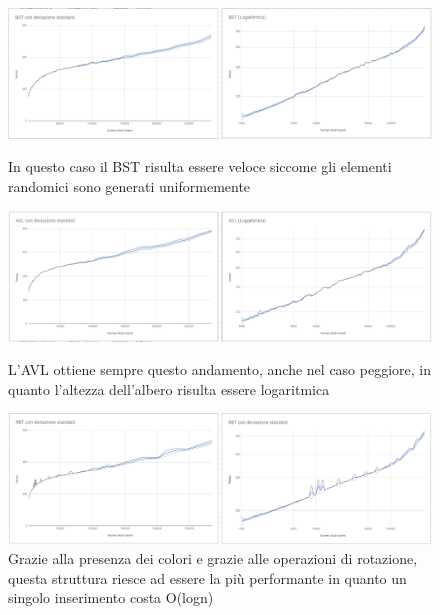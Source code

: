 \documentclass[a4paper]{article}
\begin{document}
		\begin{figure}[ht]
			\includegraphics[width=13cm]{BST}
			\caption{In questo caso il BST risulta essere veloce siccome gli elementi randomici sono generati uniformemente}
			\includegraphics[width=13cm]{AVL}
			\caption{L'AVL ottiene sempre questo andamento, anche nel caso peggiore, in quanto l'altezza dell'albero risulta essere logaritmica}
			\includegraphics[width=13cm]{RBT}
			\caption{Grazie alla presenza dei colori e grazie alle operazioni di rotazione, questa struttura riesce ad essere la più performante in quanto un singolo inserimento costa O(logn)}
		\end{figure}
		
		
		\newpage
\end{document}
